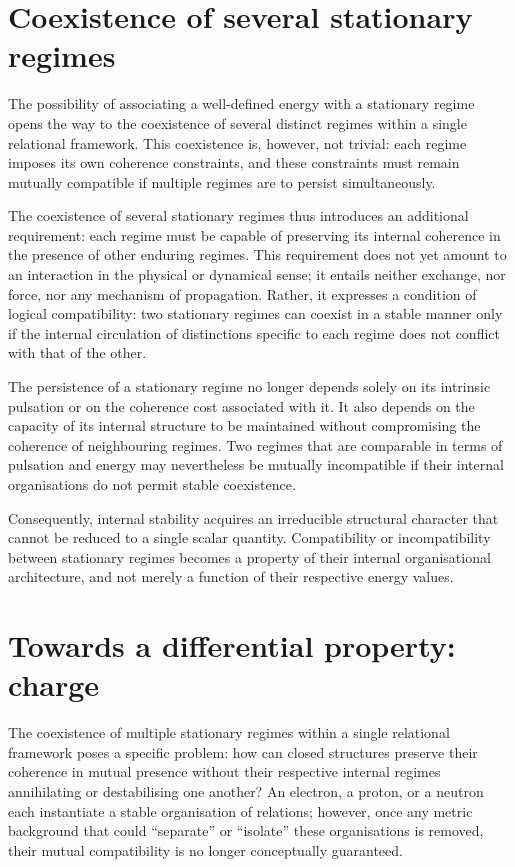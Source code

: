 \documentclass[11pt,a4paper]{article}
\begin{document}
\section{Coexistence of several stationary regimes}
The possibility of associating a well-defined energy with a stationary regime opens the way to the coexistence of several distinct regimes within a single relational framework. This coexistence is, however, not trivial: each regime imposes its own coherence constraints, and these constraints must remain mutually compatible if multiple regimes are to persist simultaneously. 

The coexistence of several stationary regimes thus introduces an additional requirement: each regime must be capable of preserving its internal coherence in the presence of other enduring regimes. This requirement does not yet amount to an interaction in the physical or dynamical sense; it entails neither exchange, nor force, nor any mechanism of propagation. Rather, it expresses a condition of logical compatibility: two stationary regimes can coexist in a stable manner only if the internal circulation of distinctions specific to each regime does not conflict with that of the other. 

The persistence of a stationary regime no longer depends solely on its intrinsic pulsation or on the coherence cost associated with it. It also depends on the capacity of its internal structure to be maintained without compromising the coherence of neighbouring regimes. Two regimes that are comparable in terms of pulsation and energy may nevertheless be mutually incompatible if their internal organisations do not permit stable coexistence. 

Consequently, internal stability acquires an irreducible structural character that cannot be reduced to a single scalar quantity. Compatibility or incompatibility between stationary regimes becomes a property of their internal organisational architecture, and not merely a function of their respective energy values.

\section{Towards a differential property: charge}
The coexistence of multiple stationary regimes within a single relational framework poses a specific problem: how can closed structures preserve their coherence in mutual presence without their respective internal regimes annihilating or destabilising one another? An electron, a proton, or a neutron each instantiate a stable organisation of relations; however, once any metric background that could “separate” or “isolate” these organisations is removed, their mutual compatibility is no longer conceptually guaranteed. 
\end{document}
